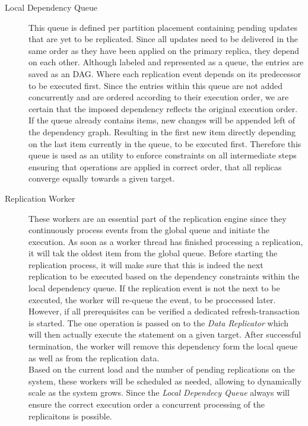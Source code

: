 \begin{description}
  
    \item[Local Dependency Queue] This queue is defined per partition placement containing pending updates that are yet to be replicated. 
    Since all updates need to be delivered in the same order as they have been applied on the primary replica, they depend on each other. 
    Although labeled and represented as a queue, the entries are saved as an DAG. Where each replication event depends on its predecessor to be executed first.
    Since the entries within this queue are not added concurrently and are ordered according to their execution order, we are certain that the imposed dependency
    reflects the original execution order. If the queue already contains items, new changes will be appended left of the dependency graph. 
    Resulting in the first new item directly depending on the last item currently in the queue, to be executed first. 
    Therefore this queue is used as an utility to enforce constraints on all intermediate steps ensuring that operations are applied 
    in correct order, that all replicas converge equally towards a given target. 


    \item[Replication Worker] These workers are an essential part of the replication engine since they continuously process events from the global queue 
    and initiate the execution. As soon as a worker thread has finished processing a replication, it will tak the oldest item from the global queue. 
    Before starting the replication process, it will make sure that this is indeed the next replication to be executed based on the dependency constraints
    within the local dependency queue. If the replication event is not the next to be executed, the worker will re-queue the event, to be proccessed later.
    However, if all prerequisites can be verified a dedicated refresh-transaction is started.
    The one operation is passed on to the \emph{Data Replicator} which will then actually execute the statement on a given target.
    After successful termination, the worker will remove this dependency form the local queue as well as from the replication data. \\
    Based on the current load and the number of pending replications on the system, these workers will be scheduled as needed, allowing to dynamically scale as the system grows.
    Since the \emph{Local Dependecy Queue} always will ensure the correct execution order a concurrent processing of the replicaitons is possible.     
    



\end{description}
